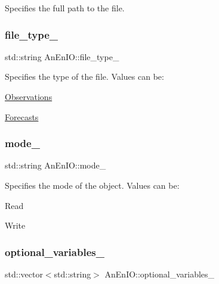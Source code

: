 Specifies the full path to the file. \mbox{\label{class_an_en_i_o_addbfb455f641a394c14907163874d8fe}} 
\subsubsection{\texorpdfstring{file\+\_\+type\+\_\+}{file\_type\_}}
{\footnotesize\ttfamily std\+::string An\+En\+I\+O\+::file\+\_\+type\+\_\+\hspace{0.3cm}{\ttfamily [protected]}}

Specifies the type of the file. Values can be\+:
\begin{DoxyItemize}
\item \mbox{\hyperlink{class_observations}{Observations}}
\item \mbox{\hyperlink{class_forecasts}{Forecasts}} 
\end{DoxyItemize}\mbox{\label{class_an_en_i_o_a311891a4a1a6b3907246da853bc4e5c8}} 
\subsubsection{\texorpdfstring{mode\+\_\+}{mode\_}}
{\footnotesize\ttfamily std\+::string An\+En\+I\+O\+::mode\+\_\+\hspace{0.3cm}{\ttfamily [protected]}}

Specifies the mode of the object. Values can be\+:
\begin{DoxyItemize}
\item Read
\item Write 
\end{DoxyItemize}\mbox{\label{class_an_en_i_o_a43f82ffbafbbda7ab8c9471d0bce70df}} 
\subsubsection{\texorpdfstring{optional\+\_\+variables\+\_\+}{optional\_variables\_}}
{\footnotesize\ttfamily std\+::vector$<$std\+::string$>$ An\+En\+I\+O\+::optional\+\_\+variables\+\_\+\hspace{0.3cm}{\ttfamily [protected]}}

